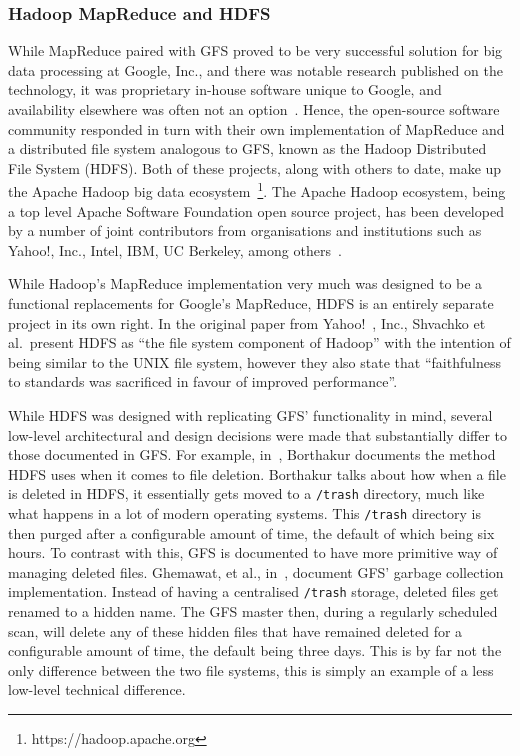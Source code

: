 

\subsubsection{Hadoop MapReduce and HDFS} %
\label{ssub:hadoop_mapreduce_and_hdfs}

While MapReduce paired with GFS proved to be very successful solution for big data processing at Google, Inc., and
there was notable research published on the technology, it was proprietary in-house software unique to Google, and
availability elsewhere was often not an option~\cite{grossman2009varieties}. Hence, the open-source software community
responded in turn with their own implementation of MapReduce and a distributed file system analogous to GFS, known as the
Hadoop Distributed File System (HDFS). Both of these projects, along with others to date, make up the Apache Hadoop
big data ecosystem~\footnote{https://hadoop.apache.org}. The Apache Hadoop ecosystem, being a top level Apache Software
Foundation open source project, has been developed by a number of joint contributors from organisations and institutions
such as Yahoo!, Inc., Intel, IBM, UC Berkeley, among others~\cite{hadoop_committers}.

While Hadoop's MapReduce implementation very much was designed to be a functional replacements for Google's MapReduce,
HDFS is an entirely separate project in its own right. In the original paper from Yahoo!~\cite{shvachko2010hadoop},
Inc., Shvachko et al.\ present HDFS as ``the file system component of Hadoop'' with the intention of being similar to
the UNIX file system, however they also state that ``faithfulness to standards was sacrificed in favour of improved
performance''.

While HDFS was designed with replicating GFS' functionality in mind, several low-level architectural and design decisions
were made that substantially differ to those documented in GFS. For example, in~\cite{borthakur2007hadoop}, Borthakur
documents the method HDFS uses when it comes to file deletion. Borthakur talks about how when a file is deleted in HDFS,
it essentially gets moved to a \texttt{/trash} directory, much like what happens in a lot of modern operating systems.
This \texttt{/trash} directory is then purged after a configurable amount of time, the default of which being six hours.
To contrast with this, GFS is documented to have more primitive way of managing deleted files. Ghemawat, et al.,
in~\cite{ghemawat_google_2003}, document GFS' garbage collection implementation. Instead of having a centralised
\texttt{/trash} storage, deleted files get renamed to a hidden name. The GFS master then, during a regularly scheduled
scan, will delete any of these hidden files that have remained deleted for a configurable amount of time, the default
being three days. This is by far not the only difference between the two file systems, this is simply an example of a
less low-level technical difference.


